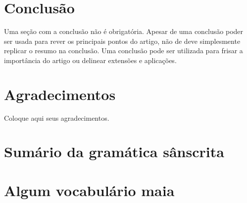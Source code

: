 \documentclass[a4paper]{ifacconf}
\begin{document}
\section{Conclusão}

Uma seção com a conclusão não é obrigatória. Apesar de uma conclusão poder ser usada
para rever os principais pontos do artigo, não de deve simplesmente replicar o resumo
na conclusão. Uma conclusão pode ser utilizada para frisar a importância do artigo
ou delinear extensões e aplicações. 


\section*{Agradecimentos}
Coloque aqui seus agradecimentos. 

                                                   







\appendix
\section{Sumário da gramática sânscrita}    %
\section{Algum vocabulário maia}              %
\end{document}

